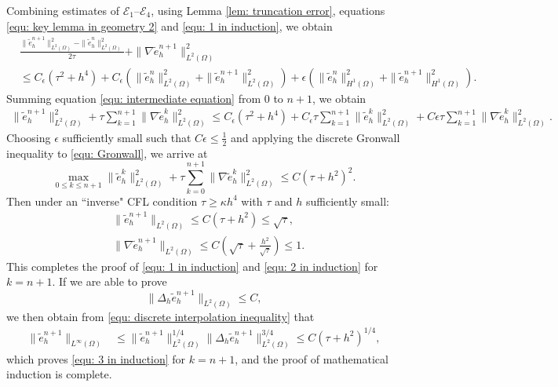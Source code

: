 \documentclass{siamart250211}
\def\nn{\nonumber}
\def\eps{\epsilon}
\begin{document}
Combining estimates of $\mathcal{E}_1$--$\mathcal{E}_4$, using Lemma \ref{lem: truncation error}, equations \eqref{equ: key lemma in geometry 2} and \eqref{equ: 1 in induction},  we obtain 
\begin{align}
	& \frac{\|\tilde{e}_h^{n+1}\|_{L^2(\Omega)}^2 - \|\tilde{e}_h^n\|_{L^2(\Omega)}^2}{2\tau} + \|\nabla \tilde{e}_h^{n+1}\|_{L^2(\Omega)}^2 \nn \\
	& \le C_{\eps} (\tau^2 + h^4) + C_{\eps} (\|\tilde{e}_h^n\|_{L^2(\Omega)}^2 + \|\tilde{e}_h^{n+1}\|_{L^2(\Omega)}^2) + \eps(\|\tilde{e}_h^n\|_{H^1(\Omega)}^2 + \|\tilde{e}_h^{n+1}\|_{H^1(\Omega)}^2). \label{equ: intermediate equation}
\end{align}
Summing equation \eqref{equ: intermediate equation} from $0$ to $n+1$, we obtain
\begin{align}
    \|\tilde{e}_h^{n+1}\|_{L^2(\Omega)}^2 + \tau \sum_{k=1}^{n+1} \|\nabla \tilde{e}_h^{k}\|_{L^2(\Omega)}^2 \le C_{\eps} (\tau^2 + h^4) + C_{\eps} \tau \sum_{k=1}^{n+1} \|\tilde{e}_h^{k}\|_{L^2(\Omega)}^2 + C \eps \tau \sum_{k=1}^{n+1} \|\nabla \tilde{e}_h^{k}\|_{L^2(\Omega)}^2. \label{equ: Gronwall}
\end{align}
Choosing $\eps$ sufficiently small such that $C \eps \le \frac12$ and applying the discrete Gronwall inequality to \eqref{equ: Gronwall}, we arrive at
\begin{equation*}
	\max_{0 \le k \le n+1} \|\tilde{e}_h^k\|_{L^2(\Omega)}^2 + \tau \sum_{k = 0}^{n+1} \|\nabla \tilde{e}_h^k\|_{L^2(\Omega)}^2 \le C (\tau + h^2)^2.
\end{equation*}
Then under an ``inverse" CFL condition $\tau \ge \kappa h^4$ with $\tau$ and $h$ sufficiently small:
\begin{align*}
	& \|\tilde{e}_h^{n+1}\|_{L^2(\Omega)} \le C(\tau + h^2) \le \sqrt{\tau}, \\
	& \|\nabla \tilde{e}_h^{n+1}\|_{L^2(\Omega)} \le C (\sqrt{\tau} + \frac{h^2}{\sqrt{\tau}}) \le 1.
\end{align*}
This completes the proof of \eqref{equ: 1 in induction} and \eqref{equ: 2 in induction} for $k = n+1$. 
If we are able to prove
\begin{equation*}\tag{$*$}
	\|\Delta_h \tilde{e}_h^{n+1}\|_{L^2(\Omega)} \le C,
\end{equation*}
we then obtain from \eqref{equ: discrete interpolation inequality} that
\begin{align*}
	\|\tilde{e}_h^{n+1}\|_{L^{\infty}(\Omega)} & \le \|\tilde{e}_h^{n+1}\|_{L^2(\Omega)}^{1/4}\|\Delta_h \tilde{e}_h^{n+1}\|_{L^2(\Omega)}^{3/4} \le C (\tau + h^2)^{1/4},
\end{align*}
which proves \eqref{equ: 3 in induction} for $k = n+1$, and the proof of mathematical induction is complete.
\end{document}
